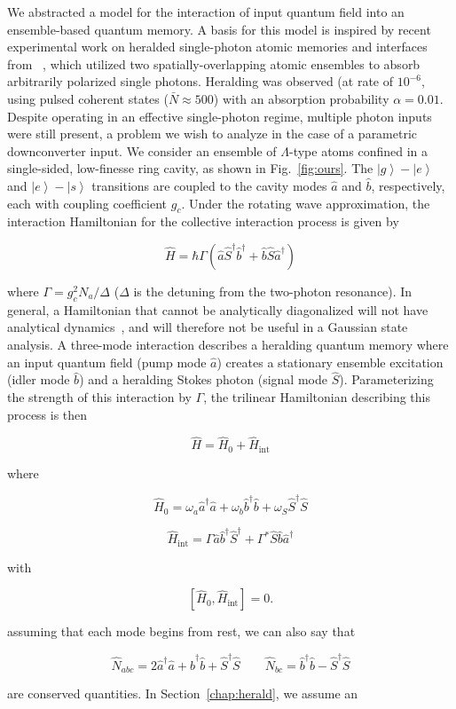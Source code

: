 \documentclass[aps,twocolumn,secnumarabic,amsmath,amssymb,pra,groupedaddress,
showpacs, showkeys,draft]{revtex4-1}
\newcommand{\ket}[1]{\left|#1\right\rangle}
\newcommand{\pna}[1]{\left(#1\right)}
\newcommand{\pnb}[1]{\left[#1\right]}
\newcommand{\eqn}[1]{
\begin{equation}
	#1
\end{equation}
}
\begin{document}
We abstracted a model for the interaction of input quantum field into an
ensemble-based quantum memory. A basis for this model is inspired by recent
experimental work on heralded single-photon atomic memories and interfaces from
\cite{PhysRevLett.98.183601}~\cite{PhysRevLett.103.043601}, which utilized two
spatially-overlapping atomic ensembles to absorb arbitrarily polarized single
photons.  Heralding was observed (at rate of $10^{-6}$, using pulsed coherent
states ($\bar{N}\approx 500$) with an absorption probability
$\alpha=0.01$. Despite operating in an effective single-photon regime, multiple
photon inputs were still present, a problem we wish to analyze in the case of a
parametric downconverter input.  We consider an ensemble of $\Lambda$-type
atoms confined in a single-sided, low-finesse ring cavity, as shown in
Fig.~\ref{fig:ours}. The $\ket{g}-\ket{e}$ and $\ket{e}-\ket{s}$ transitions
are coupled to the cavity modes $\hat{a}$ and $\hat{b}$, respectively, each
with coupling coefficient $g_c$. Under the rotating wave approximation, the
interaction Hamiltonian for the collective interaction process is given by  
\eqn{
\hat{H} = \hbar\Gamma \pna{\hat{a}\hat{S}^{\dagger}\hat{b}^{\dagger} + \hat{b}\hat{S}\hat{a}^{\dagger}}\label{eq:trilinear}
}
where $\Gamma=g_c^2 N_a/\Delta$ ($\Delta$ is the detuning from the two-photon
resonance). In general, a Hamiltonian that cannot be analytically diagonalized
will not have analytical dynamics~\cite{theoretical_qoptics,group_qoptics}, and
will therefore not be useful in a Gaussian state analysis. A three-mode
interaction describes a heralding quantum memory where an input quantum field
(pump mode $\hat{a}$) creates a stationary ensemble excitation (idler mode
$\hat{b}$) and a heralding Stokes photon (signal mode
$\hat{S}$). Parameterizing the strength of this interaction by $\Gamma$, the
trilinear Hamiltonian describing this process is then
\eqn{
\hat{H}=\hat{H}_0+\hat{H}_{\textrm{int}}\label{eq:tri_h_total}
}
where
\eqn{
\hat{H}_0=\omega_a \hat{a}^{\dagger}\hat{a}+\omega_b \hat{b}^{\dagger}\hat{b}+\omega_S \hat{S}^{\dagger}\hat{S}
}
\eqn{
\hat{H}_{\textrm{int}}=\Gamma
\hat{a}\hat{b}^{\dagger}\hat{S}^{\dagger}+\Gamma^*
\hat{S}\hat{b}\hat{a}^{\dagger} \label{eqn:final_tri_ham}
}
with 
\eqn{
\pnb{\hat{H}_0, \hat{H}_{\textrm{int}}}=0. 
}
assuming that each mode begins from rest, we can also say that 
\eqn{
\hat{N}_{abc}= 2\hat{a}^{\dagger}\hat{a}+\hat{b}^{\dagger}\hat{b} +\hat{S}^{\dagger}\hat{S} \qquad \hat{N}_{bc}=\hat{b}^{\dagger}\hat{b}-\hat{S}^{\dagger}\hat{S}
}
are conserved quantities. In Section~\ref{chap:herald}, we assume an
\end{document}
